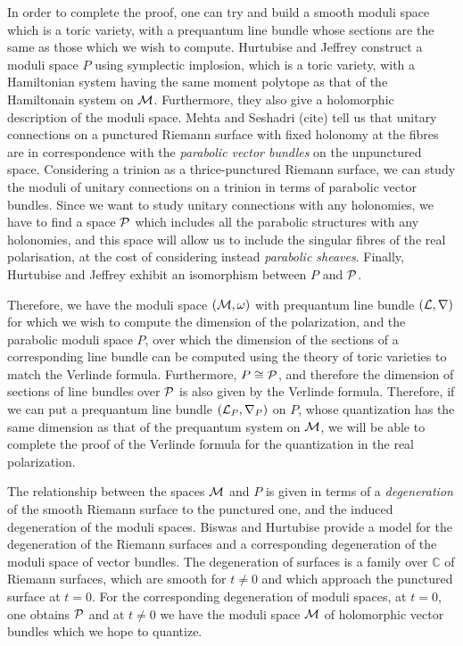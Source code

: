 	In order to complete the proof, one can try and build a smooth moduli space which is a toric variety, with a prequantum line bundle whose sections are the same as those which we wish to compute. Hurtubise and Jeffrey \cite{hurtubise_moduli_2005}\cite{hurtubise_representations_2000} construct a moduli space $P$ using symplectic implosion, which is a toric variety, with a Hamiltonian system having the same moment polytope as that of the Hamiltonain system on $\mathcal{M}$. Furthermore, they also give a holomorphic description of the moduli space. Mehta and Seshadri (cite) tell us that unitary connections on a punctured Riemann surface with fixed holonomy at the fibres are in correspondence with the \textit{parabolic vector bundles} on the unpunctured space. Considering a trinion as a thrice-punctured Riemann surface, we can study the moduli of unitary connections on a trinion in terms of parabolic vector bundles. Since we want to study unitary connections with any holonomies, we have to find a space $\mathcal{P}$ which includes all the parabolic structures with any holonomies, and this space will allow us to include the singular fibres of the real polarisation, at the cost of considering instead \emph{parabolic sheaves}. Finally, Hurtubise and Jeffrey exhibit an isomorphism between $P$ and $\mathcal{P}$.
	
	Therefore, we have the moduli space $(\mathcal{M},\omega)$ with prequantum line bundle $(\mathcal{L},\nabla)$ for which we wish to compute the dimension of the polarization, and the parabolic moduli space $P$, over which the dimension of the sections of a corresponding line bundle can be computed using the theory of toric varieties to match the Verlinde formula. Furthermore, $P \cong \mathcal{P}$, and therefore the dimension of sections of line bundles over $\mathcal{P}$ is also given by the Verlinde formula. Therefore, if we can put a prequantum line bundle $(\mathcal{L}_P, \nabla_P)$ on $P$, whose quantization has the same dimension as that of the prequantum system on $\mathcal{M}$, we will be able to complete the proof of the Verlinde formula for the quantization in the real polarization.
	
	The relationship between the spaces $\mathcal{M}$ and $P$ is given in terms of a \textit{degeneration} of the smooth Riemann surface to the punctured one, and the induced degeneration of the moduli spaces. Biswas and Hurtubise \cite{biswas_degenerations_2021} provide a model for the degeneration of the Riemann surfaces and a corresponding degeneration of the moduli space of vector bundles. The degeneration of surfaces is a family over $\mathbb{C}$ of Riemann surfaces, which are smooth for $t\neq0$ and which approach the punctured surface at $t=0$. For the corresponding degeneration of moduli spaces, at $t=0$, one obtains $\mathcal{P}$ and at $t\neq 0$ we have the moduli space $\mathcal{M}$ of holomorphic vector bundles which we hope to quantize. 
	
